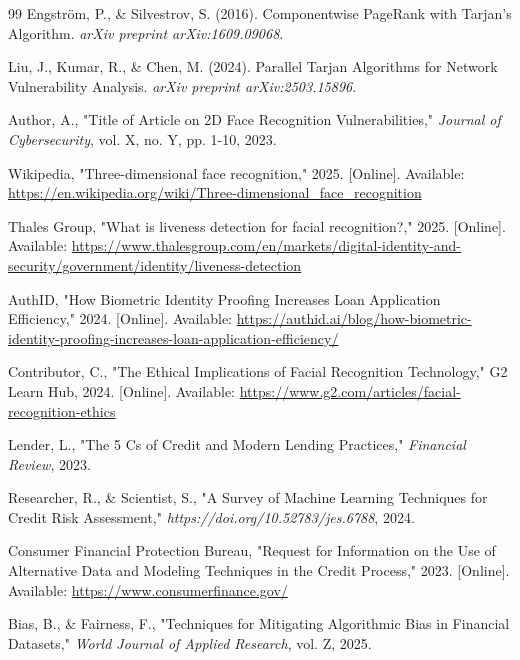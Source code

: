 \documentclass[lettersize,journal]{IEEEtran}
\begin{document}
\begin{thebibliography}{99}
 Engström, P., \& Silvestrov, S. (2016). Componentwise PageRank with Tarjan’s Algorithm. \textit{arXiv preprint arXiv:1609.09068}.

 Liu, J., Kumar, R., \& Chen, M. (2024). Parallel Tarjan Algorithms for Network Vulnerability Analysis. \textit{arXiv preprint arXiv:2503.15896}.


Author, A., "Title of Article on 2D Face Recognition Vulnerabilities," \textit{Journal of Cybersecurity}, vol. X, no. Y, pp. 1-10, 2023.

Wikipedia, "Three-dimensional face recognition," 2025. [Online]. Available: \url{https://en.wikipedia.org/wiki/Three-dimensional_face_recognition}

Thales Group, "What is liveness detection for facial recognition?," 2025. [Online]. Available: \url{https://www.thalesgroup.com/en/markets/digital-identity-and-security/government/identity/liveness-detection}

AuthID, "How Biometric Identity Proofing Increases Loan Application Efficiency," 2024. [Online]. Available: \url{https://authid.ai/blog/how-biometric-identity-proofing-increases-loan-application-efficiency/}

Contributor, C., "The Ethical Implications of Facial Recognition Technology," G2 Learn Hub, 2024. [Online]. Available: \url{https://www.g2.com/articles/facial-recognition-ethics}

Lender, L., "The 5 Cs of Credit and Modern Lending Practices," \textit{Financial Review}, 2023.

Researcher, R., \& Scientist, S., "A Survey of Machine Learning Techniques for Credit Risk Assessment," \textit{https://doi.org/10.52783/jes.6788}, 2024.

Consumer Financial Protection Bureau, "Request for Information on the Use of Alternative Data and Modeling Techniques in the Credit Process," 2023. [Online]. Available: \url{https://www.consumerfinance.gov/}


Bias, B., \& Fairness, F., "Techniques for Mitigating Algorithmic Bias in Financial Datasets," \textit{World Journal of Applied Research}, vol. Z, 2025.


\end{thebibliography}
\end{document}

